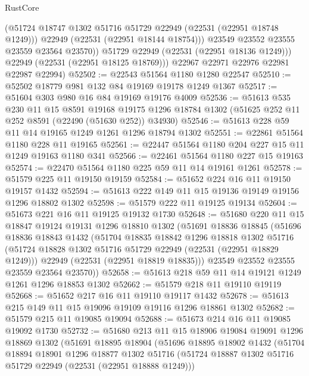 \begin{lexlean}{RustCore}
\begin{coremodule}
                (@51724 @18747 @1302 @51716 @51729 @22949 (@22531 (@22951 @18748 @1249)))
                @22949
                (@22531 (@22951 @18144 @18754)))
              @23549
              @23552
              @23555
              @23559
              @23564
              @23570))
          @51729
          @22949
          (@22531 (@22951 @18136 @1249)))
        @22949
        (@22531 (@22951 @18125 @18769)))
      @22967
      @22971
      @22976
      @22981
      @22987
      @22994)
@52502 := @22543 @51564 @1180 @1280 @22547
@52510 := @52502 @18779 @981 @132 @84 @19169 @19178 @1249 @1367
@52517 := @51604 @303 @980 @16 @84 @19169 @19176 @4009
@52536 := @51613
    @535
    @230
    @11
    @15
    @8591
    @19168
    @19175
    @1296
    @18784
    @1302
    (@51625 @252 @11 @252 @8591 (@22490 (@51630 @252)) @34930)
@52546 := @51613 @228 @59 @11 @14 @19165 @1249 @1261 @1296 @18794 @1302
@52551 := @22861 @51564 @1180 @228 @11 @19165
@52561 := @22447 @51564 @1180 @204 @227 @15 @11 @1249 @19163 @1180 @341
@52566 := @22461 @51564 @1180 @227 @15 @19163
@52574 := @22470 @51564 @1180 @225 @59 @11 @14 @19161 @1261
@52578 := @51579 @225 @11 @19150 @19159
@52584 := @51652 @224 @16 @11 @19150 @19157 @1432
@52594 := @51613 @222 @149 @11 @15 @19136 @19149 @19156 @1296 @18802 @1302
@52598 := @51579 @222 @11 @19125 @19134
@52604 := @51673 @221 @16 @11 @19125 @19132 @1730
@52648 := @51680
    @220
    @11
    @15
    @18847
    @19124
    @19131
    @1296
    @18810
    @1302
    (@51691
      @18836
      @18845
      (@51696
        @18836
        @18843
        @1432
        (@51704
          @18835
          @18842
          @1296
          @18818
          @1302
          @51716
          (@51724 @18828 @1302 @51716 @51729 @22949 (@22531 (@22951 @18829 @1249)))
          @22949
          (@22531 (@22951 @18819 @18835)))
        @23549
        @23552
        @23555
        @23559
        @23564
        @23570))
@52658 := @51613 @218 @59 @11 @14 @19121 @1249 @1261 @1296 @18853 @1302
@52662 := @51579 @218 @11 @19110 @19119
@52668 := @51652 @217 @16 @11 @19110 @19117 @1432
@52678 := @51613 @215 @149 @11 @15 @19096 @19109 @19116 @1296 @18861 @1302
@52682 := @51579 @215 @11 @19085 @19094
@52688 := @51673 @214 @16 @11 @19085 @19092 @1730
@52732 := @51680
    @213
    @11
    @15
    @18906
    @19084
    @19091
    @1296
    @18869
    @1302
    (@51691
      @18895
      @18904
      (@51696
        @18895
        @18902
        @1432
        (@51704
          @18894
          @18901
          @1296
          @18877
          @1302
          @51716
          (@51724 @18887 @1302 @51716 @51729 @22949 (@22531 (@22951 @18888 @1249)))

\end{coremodule}
\end{lexlean}

